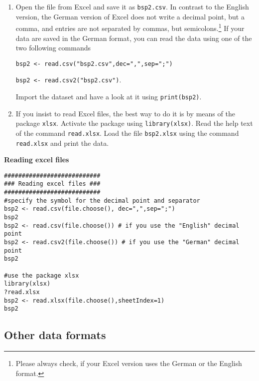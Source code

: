 \documentclass{article}
\begin{document}
\begin{enumerate}
\item Open the file from Excel and save it as \texttt{bsp2.csv}. In contrast to the English version, the German version of Excel does not write a decimal point, but a comma, and entries are not separated by commas, but semicolons.\footnote{Please always check, if your Excel version uses the German or the English format.} If your data are saved in the German format, you can read the data using one of the two following commands

    \texttt{bsp2 <- read.csv("bsp2.csv",dec=",",sep=";")}


    \texttt{bsp2 <- read.csv2("bsp2.csv")}.

    Import the dataset and have a look at it using \texttt{print(bsp2)}.

\item If you insist to read Excel files, the best way to do it is by means of the package \texttt{xlsx}. Activate the package using \texttt{library(xlsx)}. Read the help text of the command \texttt{read.xlsx}. Load the file \texttt{bsp2.xlsx} using the command \texttt{read.xlsx} and print the data.
\end{enumerate}

\begin{solution}
\textbf{Reading excel files}

\begin{verbatim}
###########################
### Reading excel files ###
###########################
#specify the symbol for the decimal point and separator
bsp2 <- read.csv(file.choose(), dec=",",sep=";")
bsp2
bsp2 <- read.csv(file.choose()) # if you use the "English" decimal point
bsp2 <- read.csv2(file.choose()) # if you use the "German" decimal point
bsp2

#use the package xlsx
library(xlsx)
?read.xlsx
bsp2 <- read.xlsx(file.choose(),sheetIndex=1)
bsp2
\end{verbatim}
\end{solution}

\subsection{Other data formats}
\end{document}
